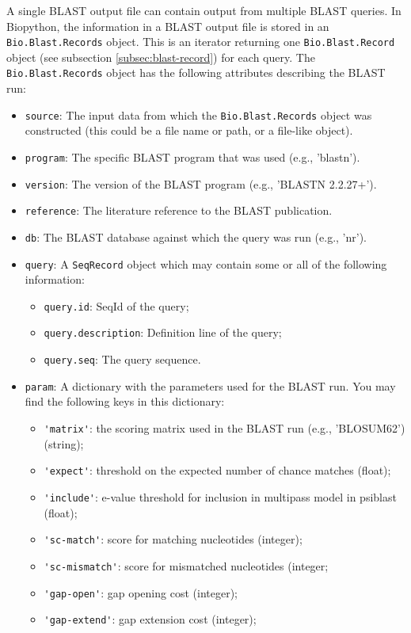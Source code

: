 A single BLAST output file can contain output from multiple BLAST queries.
In Biopython, the information in a BLAST output file is stored in an \verb|Bio.Blast.Records| object. This is an iterator returning one \verb|Bio.Blast.Record| object (see subsection \ref{subsec:blast-record}) for each query. The \verb|Bio.Blast.Records| object has the following attributes describing the BLAST run:
\begin{itemize}
\item \verb|source|: The input data from which the \verb|Bio.Blast.Records| object was constructed (this could be a file name or path, or a file-like object).
\item \verb|program|: The specific BLAST program that was used (e.g., 'blastn').
\item \verb|version|: The version of the BLAST program (e.g., 'BLASTN 2.2.27+').
\item \verb|reference|:  The literature reference to the BLAST publication.
\item \verb|db|: The BLAST database against which the query was run (e.g., 'nr').
\item \verb|query|:  A \verb|SeqRecord| object which may contain some or all of the following information:
\begin{itemize}
\item \verb|query.id|: SeqId of the query;
\item \verb|query.description|: Definition line of the query;
\item \verb|query.seq|: The query sequence.
\end{itemize}
\item \verb|param|: A dictionary with the parameters used for the BLAST run. You may find the following keys in this dictionary:
\begin{itemize}
\item \verb|'matrix'|: the scoring matrix used in the BLAST run (e.g., 'BLOSUM62') (string);
\item \verb|'expect'|: threshold on the expected number of chance matches (float);
\item \verb|'include'|: e-value threshold for inclusion in multipass model in psiblast (float);
\item \verb|'sc-match'|: score for matching nucleotides (integer);
\item \verb|'sc-mismatch'|: score for mismatched nucleotides (integer;
\item \verb|'gap-open'|: gap opening cost (integer);
\item \verb|'gap-extend'|: gap extension cost (integer);

\end{itemize}
\end{itemize}
